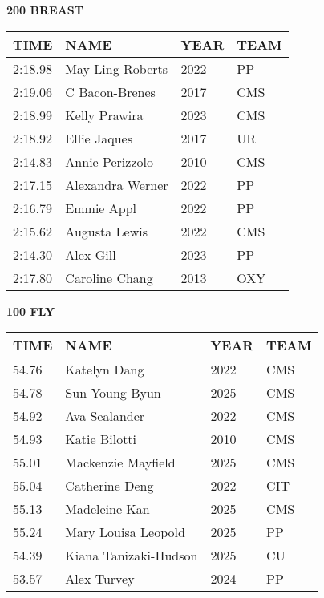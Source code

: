 \begin{table}[H]
\centering
\begin{minipage}[t]{0.48\textwidth}
\centering
\textbf{200 BREAST}\\[0.1cm]
\begin{tabular}{@{}p{1.8cm}p{2.8cm}p{1.2cm}p{1.4cm}@{}}
\hline
    \textbf{TIME} & \textbf{NAME} & \textbf{YEAR} & \textbf{TEAM} \\
\hline
    2:18.98 & May Ling Roberts & 2022 & PP \\
    2:19.06 & C Bacon-Brenes & 2017 & CMS \\
    2:18.99 & Kelly Prawira & 2023 & CMS \\
    2:18.92 & Ellie Jaques & 2017 & UR \\
    2:14.83 & Annie Perizzolo & 2010 & CMS \\
    2:17.15 & Alexandra Werner & 2022 & PP \\
    2:16.79 & Emmie Appl & 2022 & PP \\
    2:15.62 & Augusta Lewis & 2022 & CMS \\
    2:14.30 & Alex Gill & 2023 & PP \\
    2:17.80 & Caroline Chang & 2013 & OXY \\
\hline
\end{tabular}
\end{minipage}\hfill
\begin{minipage}[t]{0.48\textwidth}
\centering
\textbf{100 FLY}\\[0.1cm]
\begin{tabular}{@{}p{1.8cm}p{2.8cm}p{1.2cm}p{1.4cm}@{}}
\hline
    \textbf{TIME} & \textbf{NAME} & \textbf{YEAR} & \textbf{TEAM} \\
\hline
    54.76 & Katelyn Dang & 2022 & CMS \\
    54.78 & Sun Young Byun & 2025 & CMS \\
    54.92 & Ava Sealander & 2022 & CMS \\
    54.93 & Katie Bilotti & 2010 & CMS \\
    55.01 & Mackenzie Mayfield & 2025 & CMS \\
    55.04 & Catherine Deng & 2022 & CIT \\
    55.13 & Madeleine Kan & 2025 & CMS \\
    55.24 & Mary Louisa Leopold & 2025 & PP \\
    54.39 & Kiana Tanizaki-Hudson & 2025 & CU \\
    53.57 & Alex Turvey & 2024 & PP \\
\hline
\end{tabular}
\end{minipage}
\end{table}

